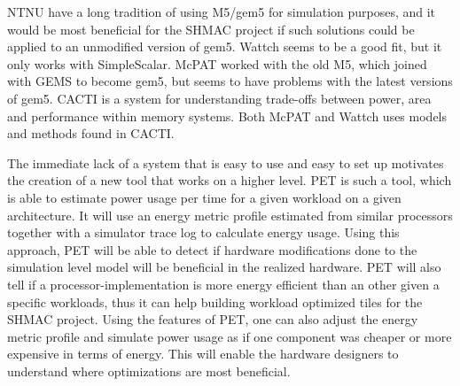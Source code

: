 NTNU have a long tradition of using M5/gem5 for simulation purposes, and it
would be most beneficial for the SHMAC project if such solutions could be
applied to an unmodified version of gem5. Wattch seems to be a good fit, but it
only works with SimpleScalar\cite{wattchanalysis}. McPAT worked with the old
M5\cite{m5mcpatparser}, which joined with GEMS to become gem5\cite{gem5hipeac},
but seems to have problems with the latest versions of
gem5\cite{mcpatgem5problems}. CACTI is a system for understanding trade-offs
between power, area and performance within memory
systems\cite{hpcacti,muralimanohar2010memory}. Both McPAT and Wattch uses models
and methods found in CACTI\cite{li2009mcpat}.

The immediate lack of a system that is easy to use and easy to set up motivates
the creation of a new tool that works on a higher level. PET is such a tool,
which is able to estimate power usage per time for a given workload on a given
architecture.  It will use an energy metric profile estimated from similar
processors together with a simulator trace log to calculate energy usage.  Using
this approach, PET will be able to detect if hardware modifications done to the
simulation level model will be beneficial in the realized hardware. PET will
also tell if a processor-implementation is more energy efficient than an other
given a specific workloads, thus it can help building workload optimized tiles
for the SHMAC project\cite{shmacwebpage}. Using the features of PET, one can
also adjust the energy metric profile and simulate power usage as if one
component was cheaper or more expensive in terms of energy. This will enable the
hardware designers to understand where optimizations are most beneficial.




